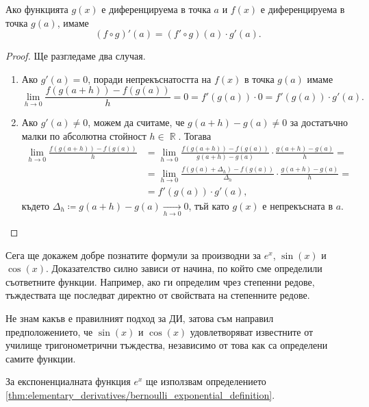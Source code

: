 \documentclass{../../common/topic}
\begin{document}
\begin{theorem}\label{thm:chain_rule}
  Ако функцията \( g(x) \) е диференцируема в точка \( a \) и \( f(x) \) е диференцируема в точка \( g(a) \), имаме
  \begin{equation*}
    (f \circ g)'(a) = (f' \circ g)(a) \cdot g'(a).
  \end{equation*}
\end{theorem}
\begin{proof}
  Ще разгледаме два случая.

  \begin{enumerate}
    \item Ако \( g'(a) = 0 \), поради непрекъснатостта на \( f(x) \) в точка \( g(a) \) имаме
    \begin{equation*}
      \lim_{h \to 0} \frac {f(g(a+h)) - f(g(a))} h
      =
      0
      =
      f'(g(a)) \cdot 0
      =
      f'(g(a)) \cdot g'(a).
    \end{equation*}

    \item Ако \( g'(a) \neq 0 \), можем да считаме, че \( g(a+h) - g(a) \neq 0 \) за достатъчно малки по абсолютна стойност \( h \in \BbbR \). Тогава
    \begin{align*}
      \lim_{h \to 0} \frac {f(g(a+h)) - f(g(a))} h
      &=
      \lim_{h \to 0} \frac {f(g(a+h)) - f(g(a))} {g(a+h) - g(a)} \cdot \frac {g(a+h) - g(a)} h
      = \\ &=
      \lim_{h \to 0} \frac {f(g(a) + \Delta_h) - f(g(a))} {\Delta_h} \cdot \frac {g(a+h) - g(a)} h
      = \\ &=
      f'(g(a)) \cdot g'(a),
    \end{align*}
    където \( \Delta_h \coloneqq g(a+h) - g(a) \xrightarrow[h \to 0]{} 0 \), тъй като \( g(x) \) е непрекъсната в \( a \).
  \end{enumerate}
\end{proof}

\begin{remark}
  Сега ще докажем добре познатите формули за производни за \( e^x \), \( \sin(x) \) и \( \cos(x) \). Доказателство силно зависи от начина, по който сме определили съответните функции. Например, ако ги определим чрез степенни редове, тъждествата ще последват директно от свойствата на степенните редове.

  Не знам какъв е правилният подход за ДИ, затова съм направил предположението, че \( \sin(x) \) и \( \cos(x) \) удовлетворяват известните от училище тригонометрични тъждества, независимо от това как са определени самите функции.

  За експоненциалната функция \( e^x \) ще използвам определението \eqref{thm:elementary_derivatives/bernoulli_exponential_definition}.
\end{remark}
\end{document}
